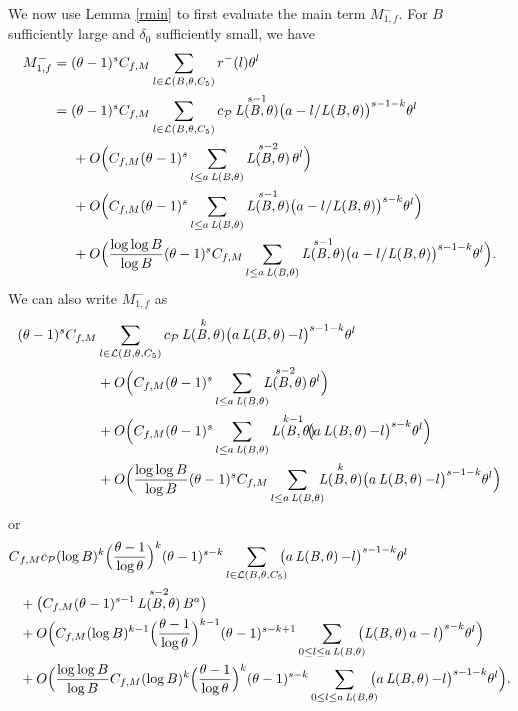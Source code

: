 \documentclass[JEP,XML,SOM,Unicode,published]{cedram}
\DeclareMathOperator{\LBt}{\mathit{L(B,\theta)}}
\newcommand{\cLBtpC}{\calL(B,\theta,C_5)}
\let\del\delta
\let\tet\theta
\newcommand{\calL}{\mathcal{L}}
\newcommand{\calP}{\mathcal{P}}
\theoremstyle{definition}
\numberwithin{theorem}{section}
\begin{document}
We now use Lemma \ref{rmin} to first evaluate the main term $M_{1,f}^-$. For $B$ sufficiently large and $\del_0$ sufficiently small, we have
\begin{equation*}
\begin{split}
M_{1,f}^-&= (\tet -1)^s C_{f,M} \sum_{l\in\cLBtpC} r^-(l) \tet^l \\
&= (\tet -1)^s C_{f,M} \sum_{l\in\cLBtpC} c_{\calP} \LBt^{s-1} \bigl(a- l/{\LBt}\bigr)^{s-1-k}\tet^l \\
&\hspace*{5mm}+O\Bigl(C_{f,M} (\tet -1)^s \sum_{l\leq a \LBt} \LBt^{s-2} \tet^l \Bigr)\\
&\hspace*{5mm}+O\Bigl(C_{f,M}(\tet -1)^s \sum_{l\leq a \LBt} \LBt^{s-1} \bigl(a- l/{\LBt}\bigr)^{s-k} \tet^l \Bigr)\\
&\hspace*{5mm}+O\Bigl(\frac{\log \log B}{\log B} (\tet -1)^s C_{f,M} \sum_{l\leq a \LBt} \LBt^{s-1} \bigl(a- l/{\LBt}\bigr)^{s-1-k}\tet^l \Bigr).
\end{split}
\end{equation*}
We can also write $M_{1,f}^-$ as\vspace*{-3pt}
\begin{equation*}
\begin{split}
 (\tet -1)^s C_{f,M} &\sum_{l\in\cLBtpC} c_{\calP} \LBt^{k} \bigl(a \LBt - l\bigr)^{s-1-k}\tet^l \\
&+O\Bigl(C_{f,M} (\tet -1)^s \sum_{l\leq a \LBt}\hspace*{-2mm} \LBt^{s-2} \tet^l \Bigr)\\
&+O\Bigl(C_{f,M}(\tet -1)^s \sum_{l\leq a \LBt} \LBt^{k-1}\hspace*{-2mm} \bigl(a\LBt - l\bigr)^{s-k} \tet^l \Bigr)\\
&+O\Bigl(\frac{\log \log B}{\log B} (\tet -1)^s C_{f,M} \sum_{l\leq a \LBt}\hspace*{-2mm} \LBt^{k} \bigl(a \LBt - l\bigr)^{s-1-k}\tet^l\Bigr)
\end{split}
\end{equation*}
or\vspace*{-3pt}
\begin{equation*}
\begin{split}
C&_{f,M}c_{\calP} (\log B)^k \Bigl(\frac{\tet -1}{\log \tet}\Bigr)^k (\tet-1)^{s-k} \sum_{{l\in\cLBtpC}}\hspace*{-2mm} \bigl(a \LBt - l\bigr)^{s-1-k}\tet^l \\
&+\bigl(C_{f,M} (\tet -1)^{s-1} \LBt^{s-2} B^{a} \bigr)\\
&+O\Bigl(C_{f,M} (\log B)^{k-1} \Bigl(\frac{\tet -1}{\log \tet}\Bigr)^{k-1}(\tet-1)^{s-k+1} \sum_{0\leq l\leq a \LBt}\hspace*{-2mm} \bigl(\LBt a- l\bigr)^{s-k} \tet^l \Bigr)\\
&+O\Bigl(\frac{\log \log B}{\log B} C_{f,M} (\log B)^k \Bigl(\frac{\tet -1}{\log \tet}\Bigr)^k (\tet-1)^{s-k} \sum_{0\leq l\leq a \LBt}\hspace*{-2mm} \bigl(a \LBt - l\bigr)^{s-1-k}\tet^l \Bigr).
\end{split}
\end{equation*}
\end{document}
